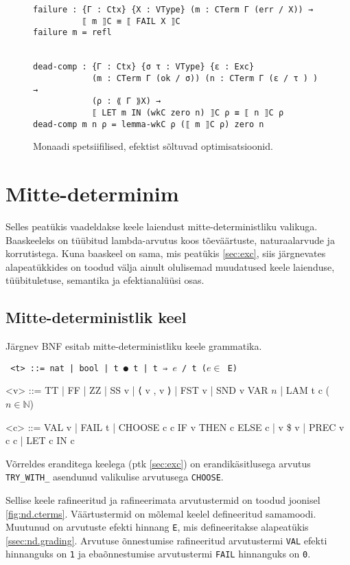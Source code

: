 \documentclass[a4paper,12pt]{article}
\begin{document}
\begin{figure}
  \begin{BVerbatim}
failure : {Γ : Ctx} {X : VType} (m : CTerm Γ (err / X)) →
          ⟦ m ⟧C ≡ ⟦ FAIL X ⟧C
failure m = refl


dead-comp : {Γ : Ctx} {σ τ : VType} {ε : Exc}
            (m : CTerm Γ (ok / σ)) (n : CTerm Γ (ε / τ ) ) →
            (ρ : ⟪ Γ ⟫X) → 
            ⟦ LET m IN (wkC zero n) ⟧C ρ ≡ ⟦ n ⟧C ρ
dead-comp m n ρ = lemma-wkC ρ (⟦ m ⟧C ρ) zero n
  \end{BVerbatim}
  \caption{Monaadi spetsiifilised, efektist sõltuvad optimisatsioonid.}
  \label{fig:exc.opt2}
\end{figure}

\clearpage\vspace*{0pt}


\section{Mitte-determinim}

Selles peatükis vaadeldakse keele laiendust mitte-deterministliku valikuga.
Baaskeeleks on tüübitud lambda-arvutus koos tõeväärtuste, naturaalarvude ja korrutistega.
Kuna baaskeel on sama, mis peatükis \ref{sec:exc}, siis järgnevates alapeatükkides on toodud välja ainult olulisemad muudatused keele laienduse, tüübituletuse, semantika ja efektianalüüsi osas.


\subsection{Mitte-deterministlik keel}

Järgnev BNF esitab mitte-deterministliku keele grammatika.
\begin{adjustwidth}{1em}{0pt}
\begin{grammar}\tt
<t> ::= nat | bool | t ● t | t ⇒ $e$ / t \hfill ($e \in$ E)
  
<v> ::= TT | FF | ZZ | SS v | ⟨ v , v ⟩ | FST v | SND v
    \alt VAR $n$ | LAM t c \hfill ($n \in \mathbb N$)
  
<c> ::= VAL v | FAIL t | CHOOSE c c
    \alt IF v THEN c ELSE c | v \$ v | PREC v c c | LET c IN c
\end{grammar}
\end{adjustwidth}

Võrreldes eranditega keelega (ptk \ref{sec:exc}) on erandikäsitlusega arvutus {\tt TRY_WITH_} asendunud valikulise arvutusega {\tt CHOOSE}.

Sellise keele rafineeritud ja rafineerimata arvutustermid on toodud joonisel \ref{fig:nd.cterms}.
Väärtustermid on mõlemal keelel defineeritud samamoodi.
Muutunud on arvutuste efekti hinnang {\tt E}, mis defineeritakse alapeatükis \ref{ssec:nd.grading}.
Arvutuse õnnestumise rafineeritud arvutustermi {\tt VAL} efekti hinnanguks on {\tt 1} ja ebaõnnestumise arvutustermi {\tt FAIL} hinnanguks on {\tt 0}.
\end{document}
